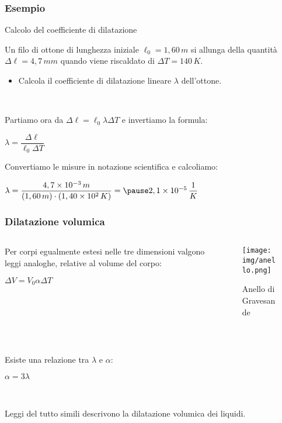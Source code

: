 \documentclass[]{beamer}
\theoremstyle{plain}
\begin{document}
\begin{frame}
\frametitle{Esempio}
\begin{exampleblock}{Calcolo del coefficiente di dilatazione}
{\small Un filo di ottone di lunghezza iniziale $ \ell_0 = 1,60 \, m $ si allunga della quantità $ \Delta\ell = 4,7 \, mm $ quando viene riscaldato di $ \Delta T = 140 \, K $.
\begin{itemize}
  \item Calcola il coefficiente di dilatazione lineare $ \lambda $ dell'ottone.
\end{itemize}}
\end{exampleblock}\pause

~

Partiamo ora da $ \Delta \ell = \ell_0 \lambda \Delta T $ e invertiamo la formula:
\begin{center}
$ \lambda = \dfrac{\Delta\ell}{\ell_0 \Delta T} $
\end{center}\pause

Convertiamo le misure in notazione scientifica e calcoliamo:
\begin{center}
$ \lambda = \dfrac{4,7 \times 10^{-3}\, m}{(1,60 \, m)\cdot(1,40 \times 10^2 \, K)} =\pause 2,1 \times10^{-5} \, \dfrac{1}{K} $
\end{center}
\end{frame}






\begin{frame}
\frametitle{Dilatazione volumica}
\begin{columns}
\begin{column}{0.65\textwidth}
Per corpi egualmente estesi nelle tre dimensioni valgono leggi analoghe, relative al \alert{volume del corpo}:
\begin{center}
\colorbox{marroncino!30}{$ \Delta V = V_0 \alpha \Delta T $}
\end{center}
\end{column}
\begin{column}{0.25\textwidth}
\begin{figure}
\texttt{[image: img/anello.png]}

{\tiny Anello di Gravesande}\pause
\end{figure}
\end{column}
\end{columns}


~

Esiste una relazione tra $ \lambda $ e $ \alpha $:
\begin{center}
$ \alpha = 3 \lambda $
\end{center}\pause

~

Leggi del tutto simili descrivono la dilatazione volumica dei liquidi.
\end{frame}
\end{document}
